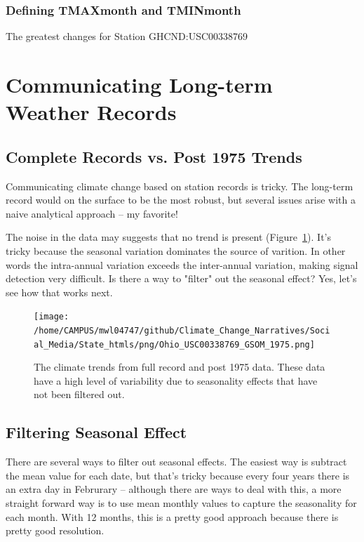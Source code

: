 \documentclass{article}\usepackage[]{graphicx}\usepackage[]{color}
\begin{document}
\subsubsection{Defining TMAXmonth and TMINmonth}


The greatest changes for Station GHCND:USC00338769

\section{Communicating Long-term Weather Records}

\subsection{Complete Records vs. Post 1975 Trends}

Communicating climate change based on station records is tricky. The long-term record would on the surface to be the most robust, but several issues arise with a naive analytical approach -- my favorite!



The noise in the data may suggests that no trend is present (Figure~\ref{fig:GSOM-1975trend}). It's tricky because the seasonal variation dominates the source of varition. In other words the intra-annual variation exceeds the inter-annual variation, making signal detection very difficult. Is there a way to "filter" out the seasonal effect? Yes, let's see how that works next. 

\begin{figure}
\texttt{[image: /home/CAMPUS/mwl04747/github/Climate\_Change\_Narratives/Social\_Media/State\_htmls/png/Ohio\_USC00338769\_GSOM\_1975.png]}
\caption{The climate trends from full record and post 1975 data. These data have a high level of variability due to seasonality effects that have not been filtered out.}
\label{fig:GSOM-1975trend}
\end{figure}


\subsection{Filtering Seasonal Effect}

There are several ways to filter out seasonal effects. The easiest way is subtract the mean value for each date, but that's tricky because every four years there is an extra day in Februrary -- although there are ways to deal with this, a more straight forward way is to use mean monthly values to capture the seasonality for each month. With 12 months, this is a pretty good approach because there is pretty good resolution. 
\end{document}
